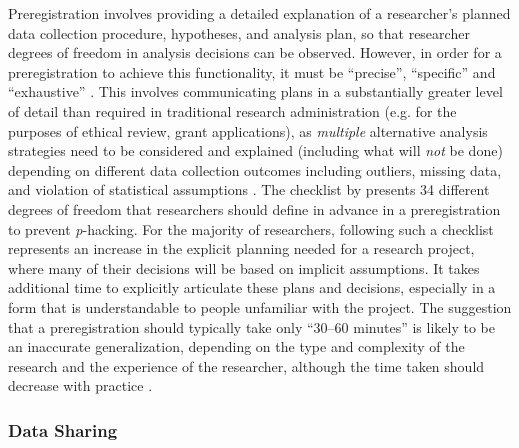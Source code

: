 \documentclass[ authordate, meta, issue]{jote-new-article}
\begin{document}
Preregistration involves providing a detailed explanation of a researcher’s planned data collection procedure, hypotheses, and analysis plan, so that researcher degrees of freedom in analysis decisions can be observed. However, in order for a preregistration to achieve this functionality, it must be “precise”, “specific” and “exhaustive” \parencites{Bakker2020}. This involves communicating plans in a substantially greater level of detail than required in traditional research administration (e.g. for the purposes of ethical review, grant applications), as \emph{multiple }alternative analysis strategies need to be considered and explained (including what will \emph{not }be done) depending on different data collection outcomes including outliers, missing data, and violation of statistical assumptions \parencites{Bakker2020}. The checklist by \textcite{Wicherts2016} presents 34 different degrees of freedom that researchers should define in advance in a preregistration to prevent \emph{p}-hacking. For the majority of researchers, following such a checklist represents an increase in the explicit planning needed for a research project, where many of their decisions will be based on implicit assumptions. It takes additional time to explicitly articulate these plans and decisions, especially in a form that is understandable to people unfamiliar with the project. The suggestion that a preregistration should typically take only “30–60 minutes” \parencites{Aguinis2020} is likely to be an inaccurate generalization, depending on the type and complexity of the research and the experience of the researcher, although the time taken should decrease with practice \parencites{Nosek2019a}.



\subsubsection{Data Sharing}
\end{document}
